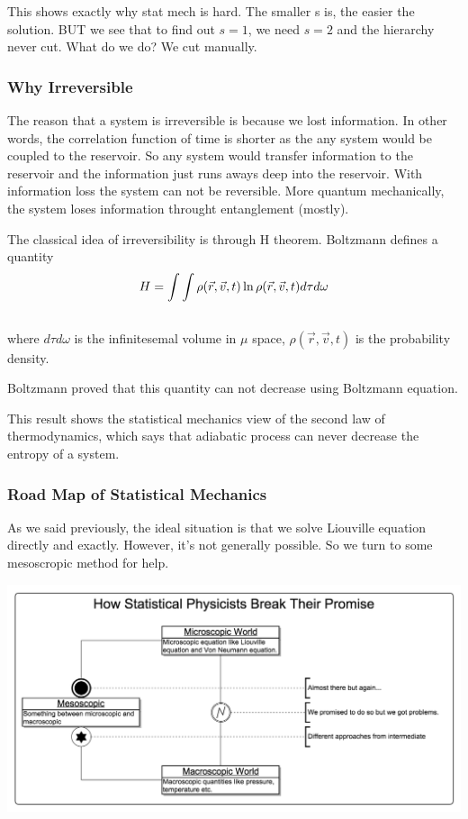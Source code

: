 \documentclass[letterpaper,10pt,english]{sphinxmanual}
\begin{document}
This shows exactly why stat mech is hard. The smaller s is, the easier the solution. BUT we see that to find out $s=1$, we need $s=2$ and the hierarchy never cut. What do we do? We cut manually.


\subsubsection{Why Irreversible}
\label{nonequilibrium/week8:why-irreversible}\label{nonequilibrium/week8:index-1}
The reason that a system is irreversible is because we lost information. In other words, the correlation function of time is shorter as the any system would be coupled to the reservoir. So any system would transfer information to the reservoir and the information just runs aways deep into the reservoir. With information loss the system can not be reversible. More quantum mechanically, the system loses information throught entanglement (mostly).

The classical idea of irreversibility is through H theorem. Boltzmann defines a quantity
\begin{gather}
\begin{split}H = \int\int \rho(\vec r,\vec v, t) \ln \rho(\vec r,\vec v, t) d\tau d\omega\end{split}\notag\\\begin{split}\end{split}\notag
\end{gather}
where $d\tau d\omega$ is the infinitesemal volume in $\mu$ space, $\rho(\vec r,\vec v, t)$ is the probability density.

Boltzmann proved that this quantity can not decrease using Boltzmann equation.

This result shows the statistical mechanics view of the second law of thermodynamics, which says that adiabatic process can never decrease the entropy of a system.


\subsubsection{Road Map of Statistical Mechanics}
\label{nonequilibrium/week8:road-map-of-statistical-mechanics}
As we said previously, the ideal situation is that we solve Liouville equation directly and exactly. However, it's not generally possible. So we turn to some mesoscropic method for help.

\includegraphics{mesoscopic.png}
\end{document}
